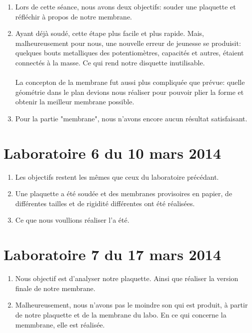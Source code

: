 \documentclass{report}
\begin{document}
\begin{enumerate}
\item
Lors de cette séance, nous avons deux objectifs: souder une plaquette et réfléchir à propos de notre membrane.
\item
Ayant déjà soudé, cette étape plus facile et plus rapide. Mais, malheureusement pour nous, une nouvelle erreur de jeunesse se produisit: quelques bouts metalliques des potentiomètres, capacités et autres, étaient connectés à la masse. Ce qui rend notre disquette inutilisable. \\ \\
La concepton de la membrane fut aussi plus compliquée que prévue: quelle géométrie dans le plan devions nous réaliser pour pouvoir plier la forme et obtenir la meilleur membrane possible.
\item Pour la partie "membrane", nous n'avons encore aucun résultat satisfaisant. 
 

\end{enumerate}

\section{Laboratoire 6 du 10 mars 2014}
\begin{enumerate}
\item Les objectifs restent les mêmes que ceux du laboratoire précédant.

\item Une plaquette a été soudée et des membranes provisoires en papier, de différentes tailles et de rigidité différentes ont été réalisées.

\item Ce que nous voullions réaliser l'a été. 

\end{enumerate}

\section{Laboratoire 7 du 17 mars 2014}
\begin{enumerate}

\item Nous objectif est d'analyser notre plaquette. Ainsi que réaliser la version finale de notre
membrane.
\item Malheureusement, nous n'avons pas le moindre son qui est produit, à partir de notre plaquette et de la membrane du labo. En ce qui concerne la memmbrane, elle est réalisée. 


\end{enumerate}
\end{document}
